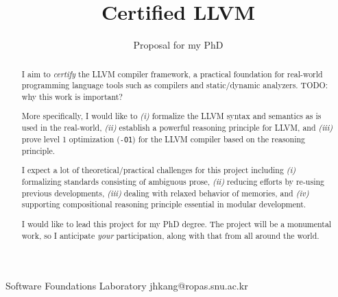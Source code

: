 \documentclass[nocopyrightspace]{sigplanconf}
\begin{document}
\setlength{\pdfpageheight}{\paperheight}
\setlength{\pdfpagewidth}{\paperwidth}






\title{Certified LLVM}
\subtitle{Proposal for my PhD}

           {Software Foundations Laboratory}
           {jhkang@ropas.snu.ac.kr}

\maketitle

\begin{abstract}
  I aim to \emph{certify} the LLVM compiler framework, a practical
  foundation for real-world programming language tools such as
  compilers and static/dynamic analyzers.  TODO: why this work is
  important?

  More specifically, I would like to \emph{(i)} formalize the LLVM
  syntax and semantics as is used in the real-world, \emph{(ii)}
  establish a powerful reasoning principle for LLVM, and \emph{(iii)}
  prove level 1 optimization (\texttt{-O1}) for the LLVM compiler
  based on the reasoning principle.

  I expect a lot of theoretical/practical challenges for this project
  including \emph{(i)} formalizing standards consisting of ambiguous
  prose, \emph{(ii)} reducing efforts by re-using previous
  developments, \emph{(iii)} dealing with relaxed behavior of
  memories, and \emph{(iv)} supporting compositional reasoning
  principle essential in modular development.

  I would like to lead this project for my PhD degree.  The project
  will be a monumental work, so I anticipate \emph{your}
  participation, along with that from all around the world.
\end{abstract}
\end{document}
